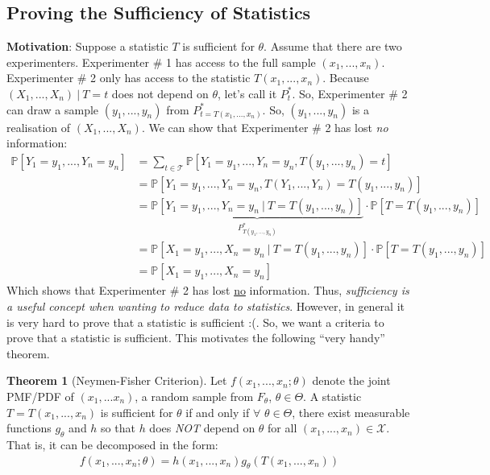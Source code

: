 \documentclass[11pt]{scrartcl}
\theoremstyle{definition}
\newtheorem{theorem}{Theorem}
\theoremstyle{remark}
\newcommand{\pr}[1]{\mathbb{P}\left[#1 \right]}
\begin{document}
{\subsection{Proving the Sufficiency of Statistics}
\textbf{Motivation}: Suppose a statistic $T$ is sufficient for $\theta$. Assume that there are two experimenters. Experimenter \# 1 has access to the full sample $(x_1, ..., x_n)$. Experimenter \# 2 only has access to the statistic $T(x_1, ..., x_n)$. Because $(X_1, ..., X_n)\ |\ T = t$ does not depend on $\theta$, let's call it $P_t^*$. So, Experimenter \# 2 can draw a sample $(y_1, ..., y_n)$ from $P^*_{t = T(x_1, ..., x_n)}$. So, $(y_1, ..., y_n)$ is a realisation of $(X_1, ..., X_n)$. We can show that Experimenter \# 2 has lost \emph{no} information: 
\begin{align*}
	\pr{Y_1 = y_1, ..., Y_n = y_n } & = \sum_{t \in \mathcal{T}} \pr{Y_1 = y_1, ..., Y_n = y_n, T(y_1, ..., y_n) = t} \\
	& = \pr{Y_1 = y_1, ..., Y_n = y_n, T(Y_1, ..., Y_n) = T(y_1, ..., y_n)} \\
	& = \underbrace{\pr{Y_1 = y_1, ..., Y_n = y_n\ |\ T = T(y_1, ..., y_n) }}_{P^*_{T(y_1, ..., y_n)}} \cdot \pr{T = T(y_1, ..., y_n)} \\
	& = \pr{X_1 = y_1, ..., X_n = y_n\ |\ T = T(y_1, ..., y_n) } \cdot \pr{T = T(y_1, ..., y_n)} \\
	& = \pr{X_1 = y_1, ..., X_n = y_n } 
\end{align*}
 Which shows that Experimenter \# 2 has lost \underline{no} information. Thus, \emph{sufficiency is a useful concept when wanting to reduce data to statistics}. However, in general it is very hard to prove that a statistic is sufficient :(. So, we want a criteria to prove that a statistic is sufficient. This motivates the following ``very handy'' theorem. 
 
 \begin{theorem}[Neymen-Fisher Criterion] 
 	Let $f(x_1, ..., x_n; \theta)$ denote the joint PMF/PDF of $(x_1, ... x_n)$, a random sample from $F_\theta$, $\theta \in \Theta$. A statistic $T=T(x_1, ..., x_n)$ is sufficient for $\theta$ if and only if $\forall$ $\theta \in \Theta$, there exist measurable functions $g_\theta$ and $h$ so that $h$ does \emph{NOT} depend on $\theta$ for all $(x_1, ..., x_n) \in \mathcal{X}$. That is, it can be decomposed in the form: 
 	\begin{align}
 		f(x_1, ..., x_n; \theta) = h(x_1, ..., x_n) g_\theta (T(x_1, ..., x_n)) 	
 	\end{align}
 \end{theorem} 
 
}
\end{document}
